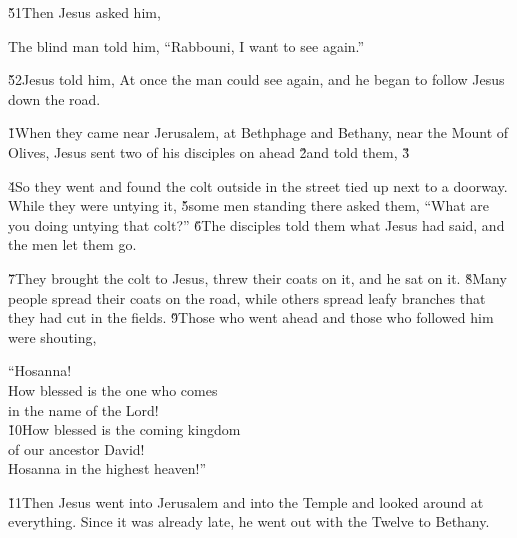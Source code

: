 \v{51}Then Jesus asked him, 

The blind man told him, ``Rabbouni, I want to see again.''

\v{52}Jesus told him,  At once the man could see again, and he began to follow Jesus down the road.

\v{1}When they came near Jerusalem, at Bethphage and Bethany, near the Mount of Olives, Jesus sent two of his disciples on ahead \v{2}and told them,  \v{3}

\v{4}So they went and found the colt outside in the street tied up next to a doorway. While they were untying it, \v{5}some men standing there asked them, ``What are you doing untying that colt?'' \v{6}The disciples told them what Jesus had said, and the men let them go.

\v{7}They brought the colt to Jesus, threw their coats on it, and he sat on it. \v{8}Many people spread their coats on the road, while others spread leafy branches that they had cut in the fields. \v{9}Those who went ahead and those who followed him were shouting,

\begin{poetry}
\poeml ``Hosanna! \\
\poeml How blessed is the one who comes \\
\poemll    in the name of the Lord! \\
\poeml \v{10}How blessed is the coming kingdom \\
\poemll    of our ancestor David! \\
\poeml Hosanna in the highest heaven!''
\end{poetry}

\v{11}Then Jesus went into Jerusalem and into the Temple and looked around at everything. Since it was already late, he went out with the Twelve to Bethany.

